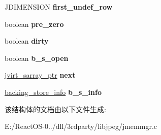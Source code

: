 \begin{DoxyCompactItemize}
J\+D\+I\+M\+E\+N\+S\+I\+ON {\bfseries first\+\_\+undef\+\_\+row}
\item 
\mbox{\label{structjvirt__sarray__control_a59c4935ba4bbb52f9c72350a0eab41ce}} 
boolean {\bfseries pre\+\_\+zero}
\item 
\mbox{\label{structjvirt__sarray__control_acfe3e74075a76da809b46b43051eeb83}} 
boolean {\bfseries dirty}
\item 
\mbox{\label{structjvirt__sarray__control_ac40cfb14df1aba304add14c5efde3594}} 
boolean {\bfseries b\+\_\+s\+\_\+open}
\item 
\mbox{\label{structjvirt__sarray__control_aed2d873c89cff97caf93e77b279bdecb}} 
\hyperlink{structjvirt__sarray__control}{jvirt\+\_\+sarray\+\_\+ptr} {\bfseries next}
\item 
\mbox{\label{structjvirt__sarray__control_ab5aaaed7f94dc70e0331855bdd6d4972}} 
\hyperlink{structbacking__store__struct}{backing\+\_\+store\+\_\+info} {\bfseries b\+\_\+s\+\_\+info}
\end{DoxyCompactItemize}


该结构体的文档由以下文件生成\+:\begin{DoxyCompactItemize}
\item 
E\+:/\+React\+O\+S-\/0../dll/3rdparty/libjpeg/jmemmgr.\+c\end{DoxyCompactItemize}
